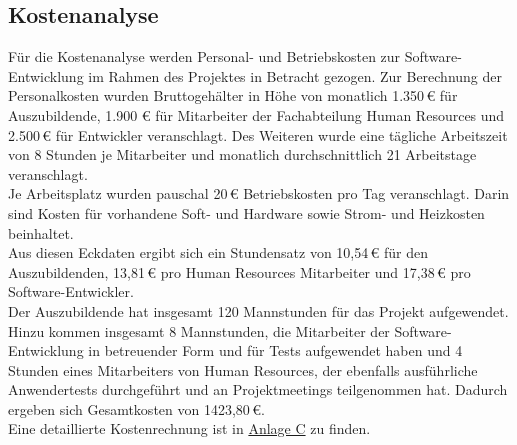 \vfill
\pagebreak

\subsection{Kostenanalyse}
    Für die Kostenanalyse werden Personal- und Betriebskosten zur Software-Entwicklung im Rahmen des Projektes in Betracht gezogen. Zur Berechnung der Personalkosten wurden Bruttogehälter in Höhe von monatlich 1.350\,€ für Auszubildende, 1.900 € für Mitarbeiter der Fachabteilung Human Resources und 2.500\,€ für Entwickler veranschlagt. Des Weiteren wurde eine tägliche Arbeitszeit von 8 Stunden je Mitarbeiter und monatlich durchschnittlich 21 Arbeitstage veranschlagt.\\
    Je Arbeitsplatz wurden pauschal 20\,€ Betriebskosten pro Tag veranschlagt. Darin sind Kosten für vorhandene Soft- und Hardware sowie Strom- und Heizkosten beinhaltet.\\
    Aus diesen Eckdaten ergibt sich ein Stundensatz von 10,54\,€ für den Auszubildenden, 13,81\,€ pro Human Resources Mitarbeiter und 17,38\,€ pro Software-Entwickler.\\
    Der Auszubildende hat insgesamt 120 Mannstunden für das Projekt aufgewendet. Hinzu kommen insgesamt 8 Mannstunden, die Mitarbeiter der Software-Entwicklung in betreuender Form und für Tests aufgewendet haben und 4 Stunden eines Mitarbeiters von Human Resources, der ebenfalls ausführliche Anwendertests durchgeführt und an Projektmeetings teilgenommen hat. Dadurch ergeben sich Gesamtkosten von 1423,80\,€.\\
    Eine detaillierte Kostenrechnung ist in \hyperref[anlage:kosten]{Anlage C} zu finden.


